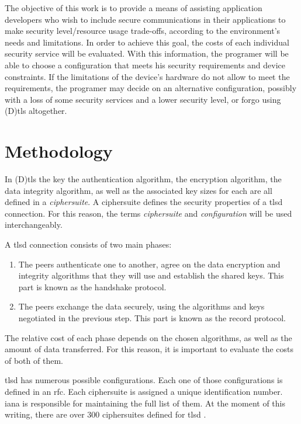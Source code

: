 \documentclass{llncs}
\begin{document}
The objective of this work is to provide a means of assisting application developers
who wish to include secure communications in their applications to make
security level/resource usage trade-offs, according to the environment's needs
and limitations. In order to achieve this goal, the costs of each individual security service
will be evaluated. With this information, the programer will be able to choose a configuration that
meets his security requirements and device constraints. If the limitations of the device's hardware
do not allow to meet the requirements, the programer may decide on an alternative configuration, possibly with
a loss of some security services and a lower security level, or forgo using (D)\gls{tls} altogether.

\section{Methodology}

In (D)\gls{tls} the key the authentication algorithm, the encryption algorithm, the
data integrity algorithm, as well as the associated key sizes for each are all defined in a \textit{ciphersuite}.
A ciphersuite defines the security properties of a \acrshort{tlsd} connection. For this reason, the terms
\textit{ciphersuite} and \textit{configuration} will be used interchangeably.

A \gls{tlsd} connection consists of two main phases:
\begin{enumerate}
  \item The peers authenticate one to another, agree on the data encryption and integrity
  algorithms that they will use and establish the shared keys. This part is known as the handshake protocol.
 \item The peers exchange the data securely, using the algorithms and keys negotiated in
the previous step. This part is known as the record protocol.
\end{enumerate}

The relative cost of each phase depends on the chosen algorithms, as well as the amount of data
transferred. For this reason, it is important to evaluate the costs of both of them.

\acrshort{tlsd} has numerous possible configurations. Each one of those configurations is defined
in an \gls{rfc}. Each ciphersuite is assigned a unique identification number. \gls{iana} is responsible for
maintaining the full list of them. At the moment of this writing, there are over $300$ ciphersuites
defined for \gls{tlsd} \cite{IANA_ciphers_list:online}.
\end{document}
